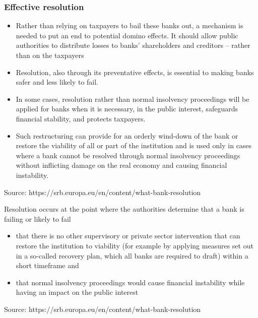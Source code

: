 \documentclass[11pt]{beamer}
\begin{document}
\begin{frame}
\frametitle{Effective resolution}
\begin{itemize}
\item Rather than relying on taxpayers to bail these banks out, a mechanism is needed to put an end to potential domino effects. It should allow public authorities to distribute losses to banks' shareholders and creditors – rather than on the taxpayers
\item Resolution, also through its preventative effects, is essential to making banks safer and less likely to fail.
\item In some cases, resolution rather than normal insolvency proceedings will be applied for banks when it is necessary, in the public interest, safeguards financial stability, and protects taxpayers.
\item Such restructuring can provide for an orderly wind-down of the bank or restore the viability of all or part of the institution and is used only in cases where a bank cannot be resolved through normal insolvency proceedings without inflicting damage on the real economy and causing financial instability.
\end{itemize}
\tiny{Source: https://srb.europa.eu/en/content/what-bank-resolution}
\end{frame}

\begin{frame}
Resolution occurs at the point where the authorities determine that a bank is failing or likely to fail
\begin{itemize}
\item that there is no other supervisory or private sector intervention that can restore the institution to viability (for example by applying measures set out in a so-called recovery plan, which all banks are required to draft) within a short timeframe and
\item that normal insolvency proceedings would cause financial instability while having an impact on the public interest
\end{itemize}
\tiny{Source: https://srb.europa.eu/en/content/what-bank-resolution}
\end{frame}
\end{document}
